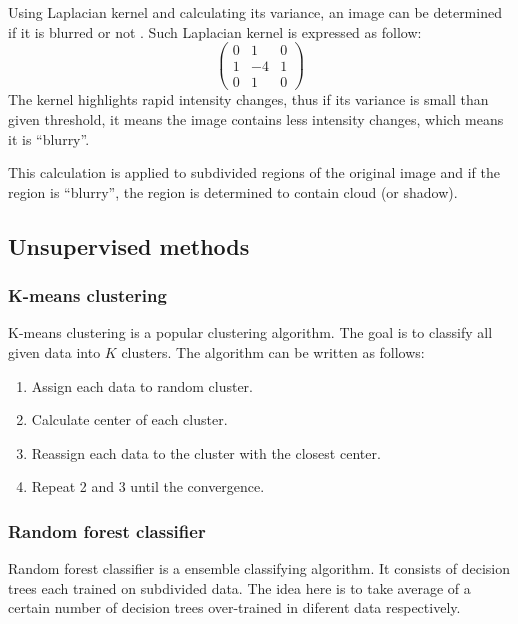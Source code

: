 \documentclass{article}
\begin{document}
            Using Laplacian kernel and calculating its variance,
            an image can be determined if it is blurred or not \cite{blur}.
            Such Laplacian kernel is expressed as follow:
            \begin{equation*}
                \begin{pmatrix}
                    0 & 1 & 0  \\
                    1 & -4 & 1 \\
                    0 & 1 & 0
                \end{pmatrix}
            \end{equation*}
            The kernel highlights rapid intensity changes,
            thus if its variance is small than given threshold,
            it means the image contains less intensity changes,
            which means it is ``blurry''.

            This calculation is applied to subdivided regions of the original image
            and if the region is ``blurry'',
            the region is determined to contain cloud (or shadow).

    \subsection{Unsupervised methods}
        \subsubsection{K-means clustering}
            K-means clustering \cite{kmeans} is a popular clustering algorithm.
            The goal is to classify all given data into $K$ clusters.
            The algorithm can be written as follows:
            \begin{enumerate}
                \item Assign each data to random cluster.
                \item Calculate center of each cluster.
                \item Reassign each data to the cluster with the closest center.
                \item Repeat 2 and 3 until the convergence.
            \end{enumerate}

        \subsubsection{Random forest classifier}
            Random forest classifier \cite{random} is a ensemble classifying algorithm.
            It consists of decision trees each trained on subdivided data.
            The idea here is to take average of a certain number of decision trees
            over-trained in diferent data respectively.
\end{document}
